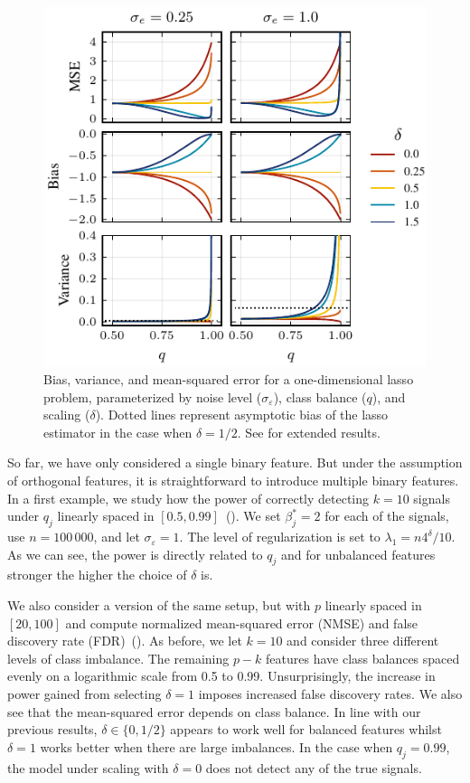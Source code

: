 \begin{figure}[htpb]
  \centering
  \includegraphics[]{plots/binary_onedim_bias_var_lasso_small.pdf}
  \caption{%
    Bias, variance, and mean-squared error for a one-dimensional lasso problem,
    parameterized by noise level (\(\sigma_\varepsilon\)), class balance (\(q\)), and
    scaling (\(\delta\)). Dotted lines represent asymptotic bias of the lasso
    estimator in the case when \(\delta = 1/2\). See 
    for extended results.}
  \label{fig:bias-var-onedim-lasso}
\end{figure}

So far, we have only considered a single binary feature. But under the assumption of
orthogonal features, it is straightforward to introduce multiple binary features. In a
first example, we study how the power of correctly detecting \(k=10\) signals under \(q_j\)
linearly spaced in \([0.5, 0.99]\)~(). We set \(\beta^*_j = 2\) for
each of the signals, use \(n = 100\,000\), and let \(\sigma_\varepsilon = 1\). The level of
regularization is set to \(\lambda_1 = n 4^\delta/10\). As we can see, the power is
directly related to \(q_j\) and for unbalanced features stronger the higher the choice of
\(\delta\) is.

We also consider a version of the same setup, but with \(p\) linearly spaced in \([20,
    100]\) and compute normalized mean-squared error (NMSE) and false discovery rate
(FDR)~(). As before, we let \(k = 10\) and consider three
different levels of class imbalance. The remaining \(p-k\) features have class balances
spaced evenly on a logarithmic scale from 0.5 to 0.99. Unsurprisingly, the increase in
power gained from selecting \(\delta = 1\) imposes increased false discovery rates. We also
see that the mean-squared error depends on class balance. In line with our previous
results, \(\delta \in \{0, 1/2\}\) appears to work well for balanced features whilst
\(\delta = 1\) works better when there are large imbalances. In the case when \(q_j =
0.99\), the model under scaling with \(\delta = 0\) does not detect any of the true
signals.

